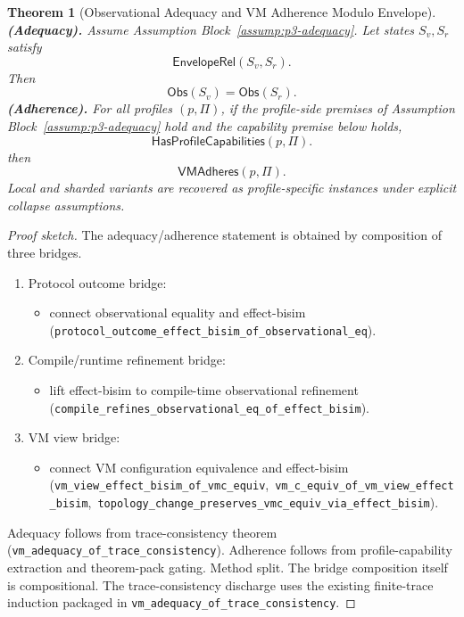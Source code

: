 \documentclass[a4paper,10pt,twocolumn,english]{article}
\numberwithin{equation}{section}
\theoremstyle{paperdef}
\theoremstyle{paperplain}
\newtheorem{theorem}[definition]{Theorem}
\theoremstyle{paperdef}
\theoremstyle{paperremark}
\theoremstyle{paperdef}
\newcommand{\EnvelopeRel}{\ensuremath{\mathsf{EnvelopeRel}}}
\newcommand{\Obs}{\ensuremath{\mathsf{Obs}}}
\newcommand{\VMAdheres}{\ensuremath{\mathsf{VMAdheres}}}
\newcommand{\HasProfileCapabilities}{\ensuremath{\mathsf{HasProfileCapabilities}}}
\begin{document}
\begin{theorem}[Observational Adequacy and VM Adherence Modulo Envelope]
	\label{thm:adequacy}
	\textbf{(Adequacy).} Assume Assumption Block~\ref{assump:p3-adequacy}.
	Let states $S_v,S_r$ satisfy
	\begin{equation}
		\EnvelopeRel(S_v,S_r).
	\end{equation}
	Then
	\begin{equation}
		\Obs(S_v) = \Obs(S_r).
	\end{equation}
	\textbf{(Adherence).} For all profiles $(p,\Pi)$, if the profile-side premises of Assumption Block~\ref{assump:p3-adequacy} hold and the capability premise below holds,
	\begin{equation}
		\HasProfileCapabilities(p,\Pi).
	\end{equation}
	then
	\begin{equation}
		\VMAdheres(p,\Pi).
	\end{equation}
	Local and sharded variants are recovered as profile-specific instances under explicit collapse assumptions.
\end{theorem}

\begin{proof}[Proof sketch]
	The adequacy/adherence statement is obtained by composition of three bridges.

	\begin{enumerate}
		\item Protocol outcome bridge:
		      \begin{itemize}
			      \item connect observational equality and effect-bisim (\nolinkurl{protocol_outcome_effect_bisim_of_observational_eq}).
		      \end{itemize}
		\item Compile/runtime refinement bridge:
		      \begin{itemize}
			      \item lift effect-bisim to compile-time observational refinement (\nolinkurl{compile_refines_observational_eq_of_effect_bisim}).
		      \end{itemize}
		\item VM view bridge:
		      \begin{itemize}
			      \item connect VM configuration equivalence and effect-bisim (\nolinkurl{vm_view_effect_bisim_of_vmc_equiv},\allowbreak\ \nolinkurl{vm_c_equiv_of_vm_view_effect_bisim},\allowbreak\ \nolinkurl{topology_change_preserves_vmc_equiv_via_effect_bisim}).
		      \end{itemize}
	\end{enumerate}

	Adequacy follows from trace-consistency theorem (\nolinkurl{vm_adequacy_of_trace_consistency}). Adherence follows from profile-capability extraction and theorem-pack gating.
	Method split. The bridge composition itself is compositional. The
	trace-consistency discharge uses the existing finite-trace induction packaged in
	\nolinkurl{vm_adequacy_of_trace_consistency}.
\end{proof}
\end{document}
